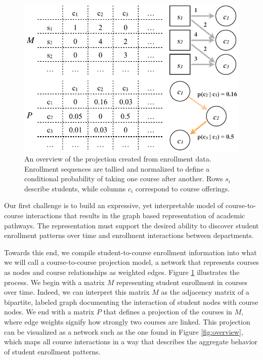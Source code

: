 \documentclass{sigchi}
\begin{document}
\begin{figure}
    \centering
    \includegraphics[width=\columnwidth]{final-simple.pdf}
    \caption{An overview of the projection created from enrollment
      data. Enrollment sequences are tallied and normalized to define
      a conditional probability of taking one course after
      another. Rows $s_i$ describe students, while columns $c_i$
      correspond to course offerings.}
    \label{fig:simple}
\end{figure}

Our first challenge is to build an expressive, yet interpretable model
of course-to-course interactions that results in the graph based
representation of academic pathways. The representation must support
the desired ability to discover student enrollment patterns over time
and enrollment interactions between departments. 

Towards this end, we compile student-to-course enrollment information
into what we will call a course-to-course projection model, a network
that represents courses as nodes and course relationships as weighted
edges. Figure \ref{fig:simple} illustrates the process. We begin with
a matrix $M$ representing student enrollment in courses over
time. Indeed, we can interpret this matrix $M$ as the adjacency matrix
of a bipartite, labeled graph documenting the interaction of student
nodes with course nodes.  We end with a matrix $P$ that defines a
projection of the courses in $M$, where edge weights signify how
strongly two courses are linked. This projection can be visualized as a network such as the one found in Figure \ref{fig:overview}, which maps all course interactions in a way that describes the aggregate behavior of student enrollment patterns.
\end{document}
